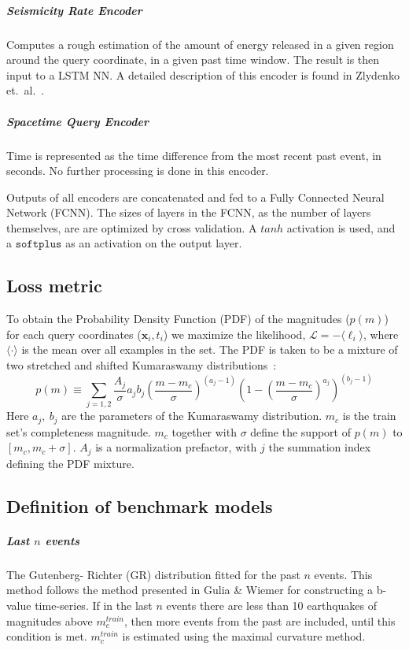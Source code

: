 \documentclass[pdflatex]{sn-jnl}
\begin{document}
\subparagraph{\textbf{Seismicity Rate Encoder}} Computes a rough estimation of the amount of energy released in a given region around the query coordinate, in a given past time window. The result is then input to a LSTM NN. A detailed description of this encoder is found in Zlydenko et.~al.~\cite{zlydenko_neural_2023}.

\subparagraph{\textbf{Spacetime Query Encoder}} Time is represented as the time difference from the most recent past event, in seconds. No further processing is done in this encoder.

Outputs of all encoders are concatenated and fed to a Fully Connected Neural Network (FCNN). The sizes of layers in the FCNN, as the number of layers themselves, are are optimized by cross validation. A $tanh$ activation is used, and a $\texttt{softplus}$ as an activation on the output layer. 

\subsection{Loss metric}
To obtain the Probability Density Function (PDF) of the magnitudes ($p(m)$) for each query coordinates ($\textbf{x}_i, t_i$) we maximize the likelihood, $\mathcal{L} = -\langle \ell_i \rangle$, where $\langle \cdot\rangle$ is the mean over all examples in the set. The PDF is taken to be a mixture of two stretched and shifted Kumaraswamy distributions~\cite{kumaraswamy_generalized_1980}:
\begin{equation}
    p\left( m \right)
    \equiv
    \sum_{j=1,2} \frac{A_j}{\sigma}a_jb_j\left(\frac{m-m_c}{\sigma}\right)^{\left(a_j-1\right)}\left(1-\left(\frac{m-m_c}{\sigma}\right)^{a_j}\right)^{\left(b_j-1\right)}
\end{equation}
Here $a_j, \ b_j$ are the parameters of the Kumaraswamy distribution. $m_c$ is the train set's completeness magnitude. $m_c$ together with $\sigma$ define the support of $p(m)$ to $[m_c, m_c+\sigma]$. $A_j$ is a normalization prefactor, with $j$ the summation index defining the PDF mixture.

\subsection{Definition of benchmark models}
\subparagraph{Last $n$ events} The Gutenberg- Richter (GR) distribution fitted for the past $n$ events. This method follows the method presented in Gulia \& Wiemer\cite{gulia_real-time_2019} for constructing a b-value time-series. If in the last $n$ events there are less than 10 earthquakes of magnitudes above $m_c^{train}$, then more events from the past are included, until this condition is met. $m_c^{train}$ is estimated using the maximal curvature method\cite{wiemer_minimum_2000}.
\end{document}
